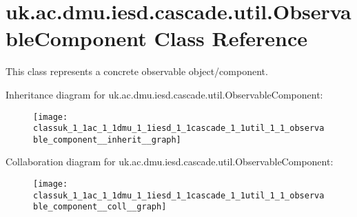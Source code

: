 \hypertarget{classuk_1_1ac_1_1dmu_1_1iesd_1_1cascade_1_1util_1_1_observable_component}{\section{uk.\-ac.\-dmu.\-iesd.\-cascade.\-util.\-Observable\-Component Class Reference}
\label{classuk_1_1ac_1_1dmu_1_1iesd_1_1cascade_1_1util_1_1_observable_component}
}


This class represents a concrete observable object/component.  




Inheritance diagram for uk.\-ac.\-dmu.\-iesd.\-cascade.\-util.\-Observable\-Component\-:\nopagebreak
\begin{figure}[H]
\begin{center}
\leavevmode
\texttt{[image: classuk\_1\_1ac\_1\_1dmu\_1\_1iesd\_1\_1cascade\_1\_1util\_1\_1\_observable\_component\_\_inherit\_\_graph]}
\end{center}
\end{figure}


Collaboration diagram for uk.\-ac.\-dmu.\-iesd.\-cascade.\-util.\-Observable\-Component\-:\nopagebreak
\begin{figure}[H]
\begin{center}
\leavevmode
\texttt{[image: classuk\_1\_1ac\_1\_1dmu\_1\_1iesd\_1\_1cascade\_1\_1util\_1\_1\_observable\_component\_\_coll\_\_graph]}
\end{center}
\end{figure}
